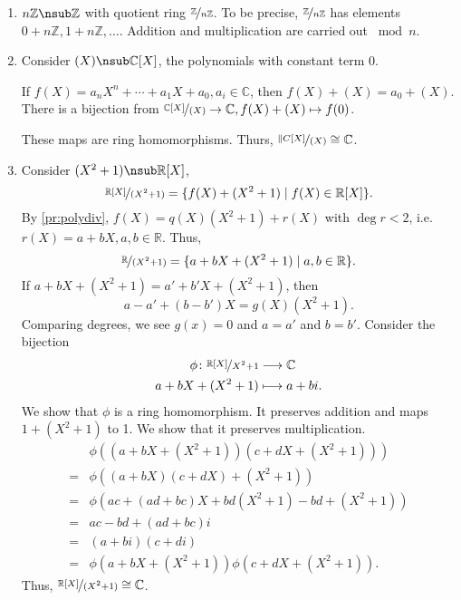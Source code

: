 \begin{example}
    \leavevmode
    \begin{enumerate}
        \item \(n\mathbb{Z}\nsub \mathbb{Z}\) with quotient ring \(\nicefrac{\mathbb{Z}}{n\mathbb{Z}}\). To be precise, \(\nicefrac{\mathbb{Z}}{n\mathbb{Z}}\) has elements \(0 + n\mathbb{Z}, 1 + n\mathbb{Z}, \ldots\).
        Addition and multiplication are carried out \(\bmod n\).
        \item Consider \((X) \nsub \mathbb{C}[X]\), the polynomials with constant term \(0\).

        If \(f(X) = a_n X^n + \cdots + a_1 X + a_0, a_i \in \mathbb{C}\), then \(f(X) + (X) = a_0 + (X)\). There is a bijection from \(\nicefrac{\mathbb{C}[X]}{(X)} \to \mathbb{C}, f(X) + (X) \mapsto f(0)\).

        These maps are ring homomorphisms. Thurs, \(\nicefrac{\|C[X]}{(X)}\cong \mathbb{C}\).
        \item Consider \((X^2 + 1) \nsub \mathbb{R}[X]\),
        \[
            \nicefrac{\mathbb{R}[X]}{(X^2 + 1)} = \{f(X) + (X^2 + 1)\mid f(X) \in \mathbb{R}[X]\}.
        \]
        By \cref{pr:polydiv}, \(f(X) = q(X)(X^2 + 1) + r(X)\) with \(\deg r < 2\), i.e. \(r(X) = a + bX, a,b \in \mathbb{R}\). Thus,
        \[\nicefrac{\mathbb{R}}{(X^2 + 1)} = \{a + bX + (X^{2} + 1)\mid a, b \in \mathbb{R}\}.\]
        If \(a + bX + (X^2 + 1) = a' + b'X + (X^2 + 1)\), then
        \[a - a' + (b - b')X = g(X)(X^2 + 1).\]
        Comparing degrees, we see \(g(x) = 0\) and \(a = a'\) and \(b = b'\). Consider the bijection
        \begin{equation*}
        \begin{aligned}
          \phi \colon \nicefrac{\mathbb{R}[X]}{X^2 + 1} & \longrightarrow \mathbb{C} \\
                    a + bX + (X^2 + 1) & \longmapsto a + b i.
        \end{aligned}
        \end{equation*}
        We show that \(\phi\) is a ring homomorphism. It preserves addition and maps \(1 + (X^2 + 1)\) to 1. We show that it preserves multiplication.
        \begin{align*}
            &\phi((a + bX + (X^2 + 1))(c + dX + (X^2 + 1)))\\
            =&\phi((a + bX)(c+dX) + (X^2 + 1))\\
            =&\phi(ac + (ad + bc)X + bd(X^2 + 1) - bd + (X^2 + 1))\\
            =&ac - bd + (ad + bc)i\\
            =&(a+bi)(c + di)\\
            =&\phi(a + bX + (X^2 + 1))\phi(c + dX + (X^2 + 1)).
        \end{align*}
        Thus, \(\nicefrac{\mathbb{R}[X]}{(X^2 + 1)} \cong \mathbb{C}\).
    \end{enumerate}
\end{example}